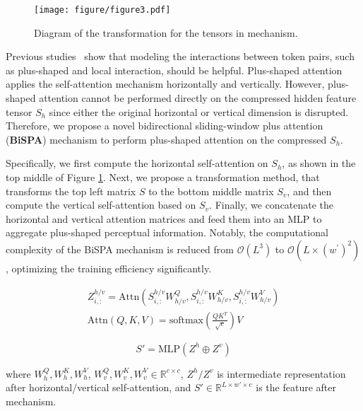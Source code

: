 \begin{figure}[t]
\centering
\texttt{[image: figure/figure3.pdf]} %
\caption{Diagram of the transformation for the \tokenspan tensors in \biswa mechanism.
}
\label{fig:token-pair-matrix}
\end{figure}

Previous studies~\cite{yan-etal-2023-embarrassingly,yan-etal-2023-utc} show that modeling the interactions between token pairs, such as plus-shaped and local interaction, should be helpful.
Plus-shaped attention applies the self-attention mechanism horizontally and vertically.
However, plus-shaped attention cannot be performed directly on the compressed hidden feature tensor $S_{h}$ since either the original horizontal or vertical dimension is disrupted.
Therefore, we propose a novel bidirectional sliding-window plus attention (\textbf{BiSPA}) mechanism to perform plus-shaped attention on the compressed $S_{h}$.

Specifically, we first compute the horizontal self-attention on $S_{h}$,
as shown in the top middle of Figure \ref{fig:token-pair-matrix}.
Next, we propose a transformation method,
that transforms the top left matrix $S$ to the bottom middle matrix $S_{v}$,
and then compute the vertical self-attention based on $S_{v}$.
Finally, we concatenate the horizontal and vertical attention matrices and feed them into an MLP to aggregate plus-shaped perceptual information.
Notably, the computational complexity of the BiSPA mechanism is reduced from $\mathcal{O}(L^3)$ to $\mathcal{O}(L \times (w^{'})^2)$,
optimizing the 
training efficiency significantly.

\begin{align}
Z^{h/v}_{i,:} =\text{Attn}\left ( S^{h/v}_{i,:}W_{h/v}^{Q}, S^{h/v}_{i,:}W_{h/v}^{K}, S^{h/v}_{i,:}W_{h/v}^{V} \right )\\
\text{Attn}\left ( Q, K, V \right )=\text{softmax}\left ( \frac{QK^{T}}{\sqrt{c}} \right )V\label{eq3}
\end{align}

\begin{equation}
{S}'=\text{MLP}\left ( Z^{h}\oplus Z^{v} \right )\label{eq4}
\end{equation}

\noindent where $W_{h}^{Q}, W_{h}^{K}, W_{h}^{V}$, $W_{v}^{Q}, W_{v}^{K}, W_{v}^{V}\in \mathbb{R}^{c\times c}$, $Z^{h}/Z^{v}$ is intermediate representation after horizontal/vertical self-attention, 
and ${S}'\in \mathbb{R}^{L\times w'\times c}$ is the \tokenspan feature after \biswa mechanism.

